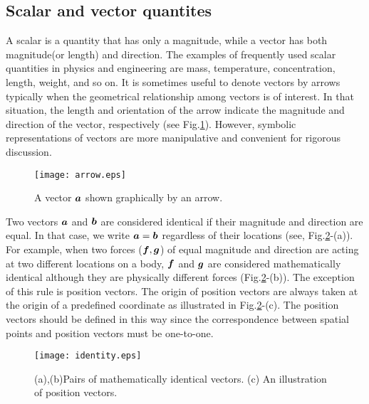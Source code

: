 \documentclass[10pt,a4j]{article}
\begin{document}
\subsection{Scalar and vector quantites}
A scalar is a quantity that has only a magnitude, while a vector has both magnitude(or length) and direction. The examples of frequently used scalar quantities in physics and engineering are mass, temperature, concentration, length, weight, and so on. It is sometimes useful to denote vectors by arrows typically when the geometrical relationship among vectors is of interest. In that situation, the length and orientation of the arrow indicate the magnitude and direction of the vector, respectively (see Fig.\ref{fig:fig1_1}). However, symbolic representations of vectors are more manipulative and convenient for rigorous discussion. 
\begin{figure}[h]
	\begin{center}
	\texttt{[image: arrow.eps]} 
	\end{center}
	\caption{A vector $\mbox{\boldmath $a$}$ shown graphically by an arrow.} 
	\label{fig:fig1_1}
\end{figure}
Two vectors $\mbox{\boldmath $a$}$ and $\mbox{\boldmath $b$}$ are considered identical 
if their magnitude and direction are equal. In that case, we write $\mbox{\boldmath $a$}=\mbox{\boldmath $b$}$ regardless of their locations (see, Fig.\ref{fig:fig1_2}-(a)). For example, when two forces ($\mbox{\boldmath $f$}, \mbox{\boldmath $g$}$) of equal magnitude and direction are acting at two different locations on a body, $\mbox{\boldmath $f$}$ and $\mbox{\boldmath $g$}$ are considered mathematically identical although they are physically different forces (Fig.\ref{fig:fig1_2}-(b)). The exception of this rule is position vectors. The origin of position vectors are always taken at the origin of a predefined coordinate as illustrated in Fig.\ref{fig:fig1_2}-(c). The position vectors should be defined in this way since the correspondence between spatial points and position vectors must be one-to-one. 
\begin{figure}[h]
    \begin{center}
    \texttt{[image: identity.eps]} 
    \end{center}
    \caption{(a),(b)Pairs of mathematically identical vectors. 
    (c) An illustration of position vectors.} 
    \label{fig:fig1_2}
\end{figure}
\end{document}
